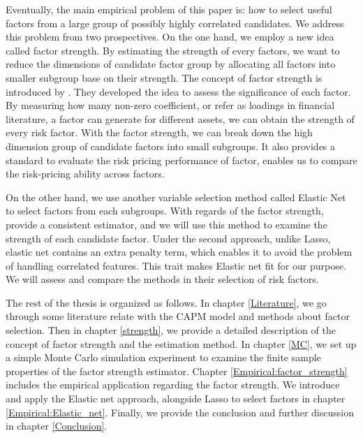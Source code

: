 Eventually, the main empirical problem of this paper is: how to select useful factors from a large group of possibly highly correlated candidates.
We address this problem from two prospectives.
On the one hand, we employ a new idea called factor strength.
By estimating the strength of every factors, we want to reduce the dimensions of candidate factor group by allocating all factors into smaller subgroup base on their strength.
The concept of factor strength is introduced by .
They developed the idea to assess the significance of each factor.
By measuring how many non-zero coefficient, or refer as loadings in financial literature, a factor can generate for different assets, we can obtain the strength of every risk factor.
With the factor strength, we can break down the high dimension group of candidate factors into small subgroups.
It also provides a standard to evaluate the risk pricing performance of factor, enables us to compare the risk-pricing ability across factors.

On the other hand, we use another variable selection method called Elastic Net \cite{Zou2005} to select factors from each subgroups.
With regards of the factor strength,  provide a consistent estimator, and we will use this method to examine the strength of each candidate factor.
Under the second approach, unlike Lasso, elastic net contains an extra penalty term, which enables it to avoid the problem of handling correlated features.
This trait makes Elastic net fit for our purpose.
We will assess and compare the methods in their selection of risk factors.

The rest of the thesis is organized as follows.
In chapter \ref{Literature}, we go through some literature relate with the CAPM model and methods about factor selection.
Then in chapter \ref{strength}, we provide a detailed description of the concept of factor strength and the estimation method.
In chapter \ref{MC}, we set up a simple Monte Carlo simulation experiment to examine the finite sample properties of the factor strength estimator.
Chapter \ref{Empirical:factor_strength} includes the empirical application regarding the factor strength.
We introduce and apply the Elastic net approach, alongside Lasso to select factors in chapter \ref{Empirical:Elastic_net}.
Finally, we provide the conclusion and further discussion in chapter \ref{Conclusion}.


